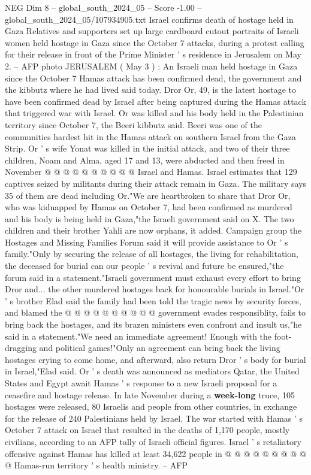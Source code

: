 \begin{textsample}{NEG Dim 8 – global\_south\_2024\_05 – Score -1.00 – global\_south\_2024\_05/107934905.txt}  \label{ex:f8_neg_098}
Israel confirms death of hostage held in Gaza Relatives and supporters set up large cardboard cutout portraits of Israeli women held hostage in Gaza since the October 7 attacks, during a protest calling for their release in front of the Prime Minister ' s residence in Jerusalem on May 2. -- AFP photo JERUSALEM ( May 3 ) : An Israeli man held hostage in Gaza since the October 7 Hamas attack has been confirmed dead, the government and the kibbutz where he had lived said today.
Dror Or, 49, is the latest hostage to have been confirmed dead by Israel after being captured during the Hamas attack that triggered war with Israel.
Or was killed and his body held in the Palestinian territory since October 7, the Beeri kibbutz said.
Beeri was one of the communities hardest hit in the Hamas attack on southern Israel from the Gaza Strip.
Or ' s wife Yonat was killed in the initial attack, and two of their three children, Noam and Alma, aged 17 and 13, were abducted and then freed in November @ @ @ @ @ @ @ @ @ @ Israel and Hamas.
Israel estimates that 129 captives seized by militants during their attack remain in Gaza.
The military says 35 of them are dead including Or."We are heartbroken to share that Dror Or, who was kidnapped by Hamas on October 7, had been confirmed as murdered and his body is being held in Gaza,"the Israeli government said on X.
The two children and their brother Yahli are now orphans, it added.
Campaign group the Hostages and Missing Families Forum said it will provide assistance to Or ' s family."Only by securing the release of all hostages, the living for rehabilitation, the deceased for burial can our people ' s revival and future be ensured,"the forum said in a statement."Israeli government must exhaust every effort to bring Dror and... the other murdered hostages back for honourable burials in Israel."Or ' s brother Elad said the family had been told the tragic news by security forces, and blamed the @ @ @ @ @ @ @ @ @ @ government evades responsiblity, fails to bring back the hostages, and its brazen ministers even confront and insult us,"he said in a statement."We need an immediate agreement!
Enough with the foot-dragging and political games!"Only an agreement can bring back the living hostages crying to come home, and afterward, also return Dror ' s body for burial in Israel,"Elad said.
Or ' s death was announced as mediators Qatar, the United States and Egypt await Hamas ' s response to a new Israeli proposal for a ceasefire and hostage release.
In late November during a \textbf{week-long} truce, 105 hostages were released, 80 Israelis and people from other countries, in exchange for the release of 240 Palestinians held by Israel.
The war started with Hamas ' s October 7 attack on Israel that resulted in the deaths of 1,170 people, mostly civilians, according to an AFP tally of Israeli official figures.
Israel ' s retaliatory offensive against Hamas has killed at least 34,622 people in @ @ @ @ @ @ @ @ @ @ Hamas-run territory ' s health ministry. -- AFP

\end{textsample}
